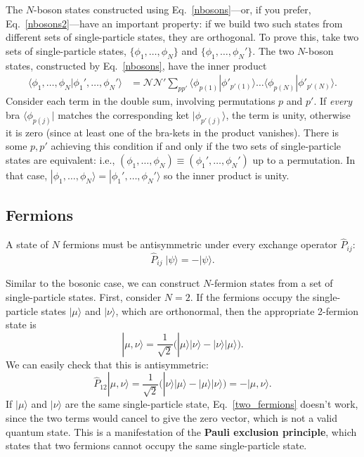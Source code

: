 \documentclass[prx,12pt]{revtex4-2}
\begin{document}
The $N$-boson states constructed using Eq.~\eqref{nbosons}---or, if
you prefer, Eq.~\eqref{nbosons2}---have an important property: if we
build two such states from different sets of single-particle states,
they are orthogonal.  To prove this, take two sets of single-particle
states, $\{\phi_1,\dots,\phi_N\}$ and $\{\phi_1,\dots,\phi_N'\}$.  The
two $N$-boson states, constructed by Eq.~\eqref{nbosons}, have the
inner product
\begin{align}
  \langle \phi_1, \dots, \phi_N | \phi_1',\dots, \phi_N'\rangle
  &= \mathcal{NN'}
  \sum_{pp'} \langle \phi_{p(1)} | \phi'_{p'(1)}\rangle \dots
  \langle \phi_{p(N)} | \phi'_{p'(N)}\rangle.
  \label{bosorthog}
\end{align}
Consider each term in the double sum, involving permutations $p$ and
$p'$.  If \textit{every} bra $\langle \phi_{p(j)}|$ matches the
corresponding ket $|\phi_{p'(j)}\rangle$, the term is unity, otherwise
it is zero (since at least one of the bra-kets in the product
vanishes).  There is some $p, p'$ achieving this condition if and only
if the two sets of single-particle states are equivalent: i.e.,
$(\phi_1,\dots, \phi_N) \equiv (\phi_1',\dots, \phi_N')$ up to a
permutation.  In that case, $| \phi_1, \dots, \phi_N \rangle = |
\phi_1',\dots, \phi_N'\rangle$ so the inner product is unity.

\subsection{Fermions}
\label{sec:fermions}

A state of $N$ fermions must be antisymmetric under every exchange
operator $\hat{P}_{ij}$:
\begin{equation}
  \hat{P}_{ij}\; |\psi\rangle = -|\psi\rangle.
\end{equation}

Similar to the bosonic case, we can construct $N$-fermion states from
a set of single-particle states.  First, consider $N=2$.  If the
fermions occupy the single-particle states $|\mu\rangle$ and
$|\nu\rangle$, which are orthonormal, then the appropriate 2-fermion
state is
\begin{equation}
  |\mu,\nu\rangle = \frac{1}{\sqrt{2}}
  \Big(|\mu\rangle|\nu\rangle - |\nu\rangle|\mu\rangle\Big).
  \label{two_fermions}
\end{equation}
We can easily check that this is antisymmetric:
\begin{equation}
  \hat{P}_{12} |\mu,\nu\rangle = \frac{1}{\sqrt{2}}
  \Big(|\nu\rangle|\mu\rangle - |\mu\rangle|\nu\rangle\Big)
  = - |\mu,\nu\rangle.
\end{equation}
If $|\mu\rangle$ and $|\nu\rangle$ are the same single-particle state,
Eq.~\eqref{two_fermions} doesn't work, since the two terms would
cancel to give the zero vector, which is not a valid quantum state.
This is a manifestation of the \textbf{Pauli exclusion principle},
which states that two fermions cannot occupy the same single-particle
state.
\end{document}
